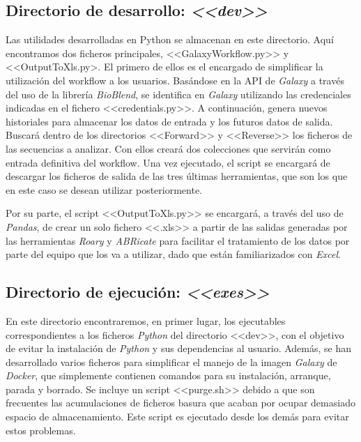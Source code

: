 \subsection{Directorio de desarrollo: \textit{<<dev>>}}
Las utilidades desarrolladas en Python se almacenan en este directorio. Aquí encontramos dos ficheros principales, <<GalaxyWorkflow.py>> y <<OutputToXls.py>. El primero de ellos es el encargado de simplificar la utilización del workflow a los usuarios. Basándose en la API de \textit{Galaxy} a través del uso de la librería \textit{BioBlend}, se identifica en \textit{Galaxy} utilizando las credenciales indicadas en el fichero <<credentials.py>>. A continuación, genera nuevos historiales para almacenar los datos de entrada y los futuros datos de salida. Buscará dentro de los directorios <<Forward>> y <<Reverse>> los ficheros de las secuencias a analizar. Con ellos creará dos colecciones que servirán como entrada definitiva del workflow. Una vez ejecutado, el script se encargará de descargar los ficheros de salida de las tres últimas herramientas, que son los que en este caso se desean utilizar posteriormente.

Por su parte, el script <<OutputToXls.py>> se encargará, a través del uso de \textit{Pandas}, de crear un solo fichero <<.xls>> a partir de las salidas generadas por las herramientas \textit{Roary} y \textit{ABRicate} para facilitar el tratamiento de los datos por parte del equipo que los va a utilizar, dado que están familiarizados con \textit{Excel}.

\subsection{Directorio de ejecución: \textit{<<exes>>}}
En este directorio encontraremos, en primer lugar, los ejecutables correspondientes a los ficheros \textit{Python} del directorio <<dev>>, con el objetivo de evitar la instalación de \textit{Python} y sus dependencias al usuario. Además, se han desarrollado varios ficheros para simplificar el manejo de la imagen \textit{Galaxy} de \textit{Docker}, que simplemente contienen comandos para su instalación, arranque, parada y borrado. Se incluye un script <<purge.sh>> debido a que son frecuentes las acumulaciones de ficheros basura que acaban por ocupar demasiado espacio de almacenamiento. Este script es ejecutado desde los demás para evitar estos problemas.

\newpage \thispagestyle{empty} %
